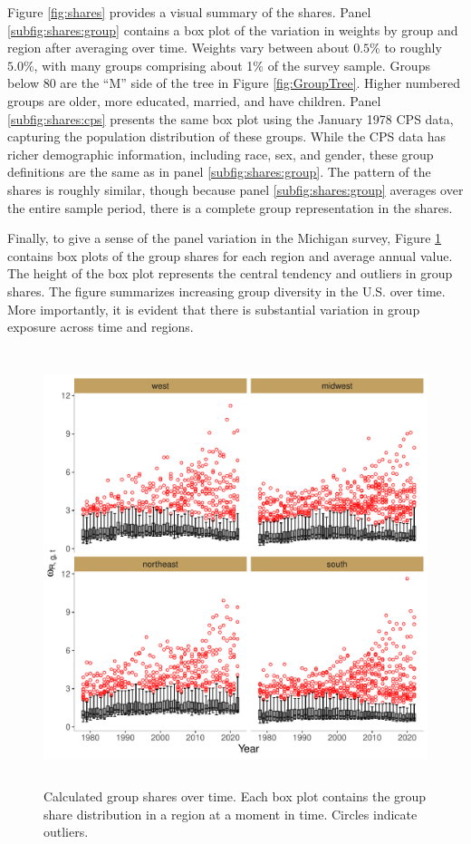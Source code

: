 \documentclass[12pt]{article}
\begin{document}
Figure \ref{fig:shares} provides a visual summary of the shares. Panel \ref{subfig:shares:group} contains a box plot of the variation in weights by group and region after averaging over time. Weights vary between about $0.5\%$ to roughly $5.0\%$, with many groups comprising about 1\% of the survey sample. Groups below 80 are the ``M'' side of the tree in Figure \ref{fig:GroupTree}. Higher numbered groups are older, more educated, married, and have children. Panel \ref{subfig:shares:cps} presents the same box plot using the January 1978 CPS data, capturing the population distribution of these groups. While the CPS data has richer demographic information, including race, sex, and gender, these group definitions are the same as in panel \ref{subfig:shares:group}. The pattern of the shares is roughly similar, though because panel \ref{subfig:shares:group} averages over the entire sample period, there is a complete group representation in the shares.  


Finally, to give a sense of the panel variation in the Michigan survey, Figure \ref{fig:sharesTime} contains box plots of the group shares for each region and average annual value. The height of the box plot represents the central tendency and outliers in group shares. The figure summarizes increasing group diversity in the U.S. over time. More importantly, it is evident that there is substantial variation in group exposure across time and regions.
\begin{figure}
\centering
\caption{Calculated group shares over time. Each box plot contains the group share distribution in a region at a moment in time. Circles indicate outliers.}\label{fig:sharesTime}
\centering
\includegraphics[width = 6in, height =5in]{figs/weightsTime.pdf}
\end{figure}
\end{document}

